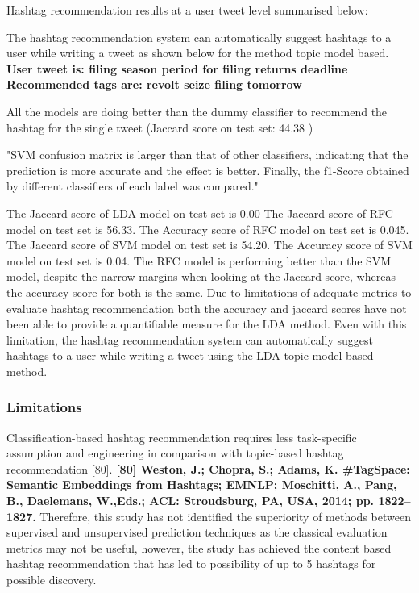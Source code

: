 Hashtag recommendation results at a user tweet level summarised below:

The hashtag recommendation system can automatically suggest hashtags to a user while writing a tweet as shown below for the method topic model based.    \textbf{User tweet is: filing season period for filing returns deadline
Recommended tags are: revolt seize filing tomorrow}

All the models are doing better than the dummy classifier to recommend the hashtag for the single tweet (Jaccard score on test set: 44.38 )

"SVM confusion matrix is larger than that of other classifiers,
indicating that the prediction is more accurate and the effect
is better. Finally, the f1-Score obtained by different classifiers
of each label was compared."

The Jaccard score of LDA model on test set is 0.00
The Jaccard score of RFC model on test set is 56.33.
The Accuracy score of RFC model on test set is 0.045.
The Jaccard score of SVM model on test set is 54.20.
The Accuracy score of SVM model on test set is 0.04.
The RFC model is performing better than the SVM model, despite the narrow margins when looking at the Jaccard score, whereas the accuracy score for both is the same.  Due to limitations of adequate metrics to evaluate hashtag recommendation both the accuracy and jaccard scores have not been able to provide a quantifiable measure for the LDA method.  Even with this limitation, the hashtag recommendation system can automatically suggest hashtags to a user while writing a tweet using the LDA topic model based method. 

\subsubsection{Limitations}

Classification-based hashtag recommendation requires less task-specific assumption and engineering in comparison with topic-based hashtag recommendation [80].    \textbf{[80] Weston, J.; Chopra, S.; Adams, K. #TagSpace: Semantic Embeddings from Hashtags; EMNLP; Moschitti, A., Pang, B., Daelemans, W.,Eds.; ACL: Stroudsburg, PA, USA, 2014; pp. 1822–1827.}
Therefore, this study has not identified the superiority of methods between supervised and unsupervised prediction techniques as the classical evaluation metrics may not be useful, however, the study has achieved the  content based hashtag recommendation that has led to possibility of up to 5 hashtags for possible discovery.

